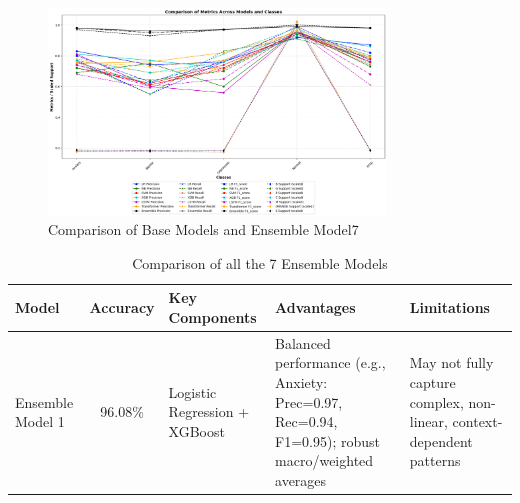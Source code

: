 \begin{figure}[h!]  
    \centering
    \includegraphics[width=0.8\textwidth]{Images/EM T RESULT.png}  
    \caption*{Comparison of Base Models and Ensemble Model7}
    \label{lstm arch}  %
\end{figure}

\begin{table}[H]
    \centering
    \caption*{Comparison of all the 7 Ensemble Models}
    \label{tab:ensemble_comparison}
    \begin{tabularx}{\textwidth}{|l|c|X|X|X|}
    \hline
    \textbf{Model} & \textbf{Accuracy} & \textbf{Key Components} & \textbf{Advantages} & \textbf{Limitations} \\
    \hline
    Ensemble Model 1 & 96.08\% & Logistic Regression + XGBoost & Balanced performance (e.g., Anxiety: Prec=0.97, Rec=0.94, F1=0.95); robust macro/weighted averages & May not fully capture complex, non-linear, context-dependent patterns \\
    \hline
\end{tabularx}
\end{table}

\pagebreak

